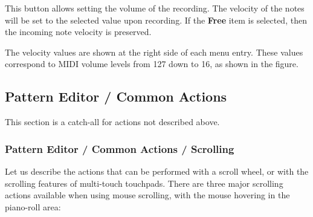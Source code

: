    This button allows setting the volume of the recording.
   The velocity of the notes will be set to the selected value upon recording.
   If the \textbf{Free} item is selected, then the incoming note velocity is
   preserved.


   The velocity values are shown at the right side of each menu entry.
   These values correspond to MIDI volume levels from 127 down to 16, as
   shown in the figure.


\subsection{Pattern Editor / Common Actions}
\label{subsec:pattern_editor_common}

   This section is a catch-all for actions not described above.

\subsubsection{Pattern Editor / Common Actions / Scrolling}
\label{subsec:pattern_editor_scrolling}

   Let us describe the actions that can be performed with a
   scroll wheel, or with the scrolling features of multi-touch touchpads.
   There are three major scrolling actions available when using mouse
   scrolling, with the mouse hovering in the piano-roll area:


